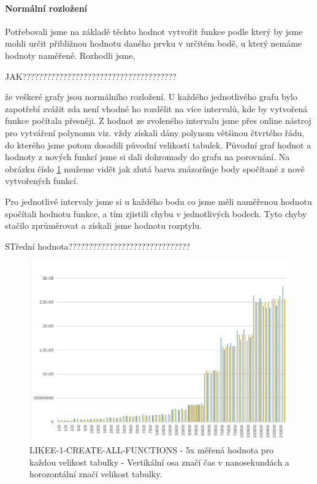 \documentclass[a4paper, 11pt]{article}
\begin{document}
\paragraph{Normální rozložení} Potřebovali jsme na základě těchto hodnot vytvořit funkce podle který by jsme mohli určit přibližnou hodnotu daného prvku v určitém bodě, u který nemáme hodnoty naměřené. Rozhodli jsme, 

JAK??????????????????????????????????????

že veškeré grafy jsou normálního rozložení. U každého jednotlivého grafu bylo zapotřebí zvážit zda není vhodné ho rozdělit na více intervalů, kde by  vytvořená funkce počítala přesněji. Z hodnot ze zvoleného intervalu jsme přes online nástroj pro vytváření polynomu viz. \cite{polregres} vždy získali dány polynom většinou čtvrtého řádu, do kterého jsme potom dosadili původní velikosti tabulek. Původní graf hodnot a hodnoty z nových funkcí jsme si dali dohromady do grafu na porovnání. Na obrázku číslo \ref{sec:obr2} mužeme vidět jak zlutá barva znázorňuje body spočítané z nově vytvořených funkcí. 


Pro jednotlivé intervaly jsme si u každého bodu co jsme měli naměřenou hodnotu spočítali hodnotu funkce, a tím zjistili chybu v jednotlivých bodech. Tyto chyby stačilo zprůměrovat a získali jsme hodnotu rozptylu.

STřední hodnota??????????????????????????????

\begin{figure}[H]
\centering
\includegraphics[width=150mm]{images/LIKEE-1-CREATE-ALL-FUNCTIONS.png}
\caption{LIKEE-1-CREATE-ALL-FUNCTIONS - 5x měřená hodnota pro každou velikost tabulky - Vertikální osa značí čas v nanosekundách a horozontální značí velikost tabulky.}
\label{sec:obr2}
\end{figure}
\end{document}

